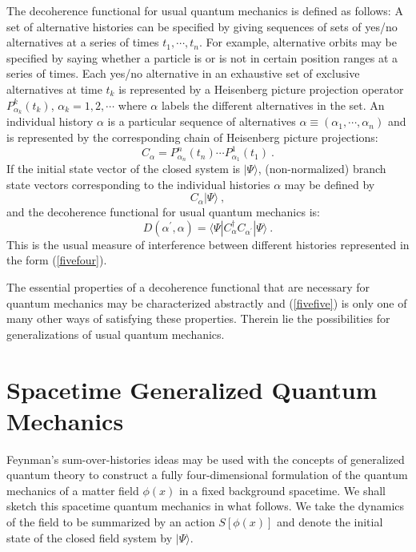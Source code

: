 The decoherence functional for usual quantum mechanics is defined as
follows: A set of alternative histories can be specified by giving
sequences of sets of yes/no alternatives at a series of times
$t_1,\cdots,t_n$. For example, alternative orbits may be specified by
saying whether a particle is or is not in certain position ranges at a
series of times.  Each yes/no alternative in an exhaustive set of
exclusive alternatives at time $t_k$ is represented by a Heisenberg picture
projection operator $P^k_{\alpha_k}(t_k)$, $\alpha_k = 1,2,\cdots$ where $\alpha$ labels
the different alternatives in the set. An 
individual history $\alpha$ is a particular
sequence of alternatives $\alpha \equiv (\alpha_1,\cdots,\alpha_n)$ and
is represented by the corresponding chain of Heisenberg picture
projections:
\begin{equation}
C_\alpha = P^n_{\alpha_n}(t_n) \cdots P^1_{\alpha_1}(t_1)\ .
\label{fivethree}
\end{equation}
If the initial state vector of the closed system is $|\Psi\rangle$,
(non-normalized) branch state vectors corresponding to the
individual histories $\alpha$ may be defined by
\begin{equation}
C_\alpha |\Psi\rangle\ ,
\label{fivefour}
\end{equation}
and the decoherence functional for usual quantum mechanics is:
\begin{equation}
D(\alpha^\prime,\alpha)= \langle\Psi
|C^\dagger_\alpha C_{\alpha^\prime}
|\Psi\rangle\ .
\label{fivefive}
\end{equation}
This is the usual measure of interference between different histories
represented in the form (\ref{fivefour}).

The essential properties of a decoherence functional that are necessary
for quantum mechanics may be characterized abstractly \cite{Ish94} and
(\ref{fivefive}) is only one of many other ways of satisfying these
properties.  Therein lie the possibilities for generalizations of usual
quantum mechanics. 

\section{Spacetime Generalized Quantum Mechanics}

Feynman's sum-over-histories ideas may be used with the concepts of
generalized quantum theory to construct a fully four-dimensional
formulation of the quantum mechanics of a matter
field $\phi(x)$ in a fixed background spacetime.
 We shall sketch this spacetime quantum
mechanics in what follows. We take the dynamics of the field to be
summarized by an action $S[\phi(x)]$ and denote the initial state of the
closed field system by $|\Psi\rangle$.

